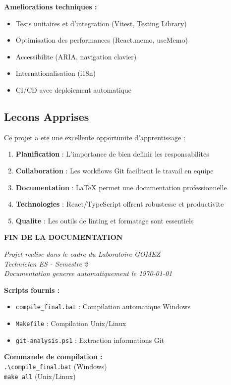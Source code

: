 \documentclass[12pt,a4paper]{article}
\begin{document}
\textbf{Ameliorations techniques :}
\begin{itemize}
    \item Tests unitaires et d'integration (Vitest, Testing Library)
    \item Optimisation des performances (React.memo, useMemo)
    \item Accessibilite (ARIA, navigation clavier)
    \item Internationalisation (i18n)
    \item CI/CD avec deploiement automatique
\end{itemize}

\subsection{Lecons Apprises}

Ce projet a ete une excellente opportunite d'apprentissage :

\begin{enumerate}
    \item \textbf{Planification} : L'importance de bien definir les responsabilites
    \item \textbf{Collaboration} : Les workflows Git facilitent le travail en equipe
    \item \textbf{Documentation} : LaTeX permet une documentation professionnelle
    \item \textbf{Technologies} : React/TypeScript offrent robustesse et productivite
    \item \textbf{Qualite} : Les outils de linting et formatage sont essentiels
\end{enumerate}

\vspace{2cm}

\begin{center}
\textbf{FIN DE LA DOCUMENTATION}

\vspace{1cm}

\textit{Projet realise dans le cadre du Laboratoire GOMEZ}\\
\textit{Technicien ES - Semestre 2}\\
\textit{Documentation generee automatiquement le \today}

\vspace{1cm}

\textbf{Scripts fournis :}
\begin{itemize}
    \item \texttt{compile\_final.bat} : Compilation automatique Windows
    \item \texttt{Makefile} : Compilation Unix/Linux
    \item \texttt{git-analysis.ps1} : Extraction informations Git
\end{itemize}

\textbf{Commande de compilation :}\\
\texttt{.\textbackslash compile\_final.bat} (Windows)\\
\texttt{make all} (Unix/Linux)
\end{center}
\end{document}
